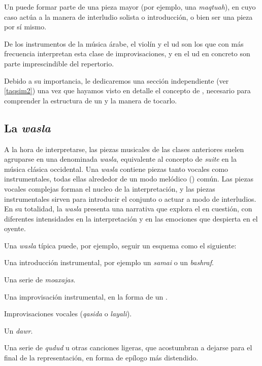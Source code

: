         Un \taqsim puede formar parte de una pieza mayor (por ejemplo, una \emph{maqtuah}), en cuyo caso actúa a la manera de interludio solista o introducción, o bien ser una pieza por sí mismo.

        De los instrumentos de la música árabe, el violín y el ud son los que con más frecuencia interpretan esta clase de improvisaciones, y en el ud en concreto son parte imprescindible del repertorio.

        Debido a su importancia, le dedicaremos una sección independiente (ver \ref{taqsim2}) una vez que hayamos visto en detalle el concepto de \maqamb, necesario para comprender la estructura de un \taqsim y la manera de tocarlo.


  \subsection{La \emph{wasla}}

      A la hora de interpretarse, las piezas musicales de las clases anteriores suelen agruparse en una denominada \emph{wasla}, equivalente al concepto de \emph{suite} en la música clásica occidental. Una \emph{wasla} contiene piezas tanto vocales como instrumentales, todas ellas alrededor de un modo melódico (\maqamb) común. Las piezas vocales complejas forman el nucleo de la interpretación, y las piezas instrumentales sirven para introducir el conjunto o actuar a modo de interludios. En su totalidad, la \emph{wasla} presenta una narrativa que explora el \maqam en cuestión, con diferentes intensidades en la interpretación y en las emociones que despierta en el oyente.

      Una \emph{wasla} típica puede, por ejemplo, seguir un esquema como el siguiente:

      \begin{compactitem}
        \item Una introducción instrumental, por ejemplo un \emph{samai} o un \emph{bashraf}.
        \item Una serie de \emph{moaxajas}.
        \item Una improvisación instrumental, en la forma de un \taqsimb.
        \item Improvisaciones vocales (\emph{qasida} o \emph{layali}).
        \item Un \emph{dawr}.
        \item Una serie de \emph{qudud} u otras canciones ligeras, que acostumbran a dejarse para el final de la representación, en forma de epílogo más distendido.
      \end{compactitem}

\pagestyle{empty}



